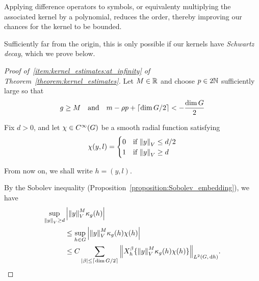 Applying difference operators to symbols,
or equivalenty multiplying the associated kernel by a polynomial,
reduces the order,
thereby improving our chances for the kernel to be bounded.

Sufficiently far from the origin,
this is only possible if our kernels have \emph{Schwartz decay},
which we prove below.

\begin{proof}[Proof of~\ref{item:kernel_estimates:at_infinity} of Theorem~\ref{theorem:kernel_estimates}]
    Let $M \in \mathbb{R}$ and choose $p \in 2 \mathbb{N}$ sufficiently large so that
    \begin{align*}
        g \geq M \quad \text{and} \quad
        m - \rho p + \lceil\dim G / 2\rceil < -\frac {\dim G} 2
    \end{align*}

    Fix $d > 0$,
    and let $\chi \in {C^\infty(G)}$ be a smooth radial function satisfying
    \begin{align*}
        \chi(y, l) =
        \begin{cases}
            0 & \text{if } {\left\| y \right\|}_{V} \leq d/2\\
            1 & \text{if } {\left\| y \right\|}_{V} \geq d
        \end{cases}
    \end{align*}

    From now on, we shall write $h = (y, l)$.

    By the Sobolev inequality (Proposition~\ref{proposition:Sobolev_embedding}),
    we have
    \begin{align}
        \sup_{\norm y \geq d} &\abs{\norm y^M \kappa_g(h)} \notag\\
        &\leq \sup_{h \in \Group} \abs{\norm y^M \kappa_g(h) \chi(h)} \notag\\
        &\leq C \sum_{\abs \beta \leq \Ceiling {\dim \Group / 2}} \norm [\Lebesgue 2 {\Group, \dd h}] {\LeftDifferentialOperator [h] \beta \{\norm y^M \kappa_g(h) \chi(h)\}}.
        \label{eq:Schwartz_decay_of_kernel:first_estimate}
    \end{align}


\end{proof}
